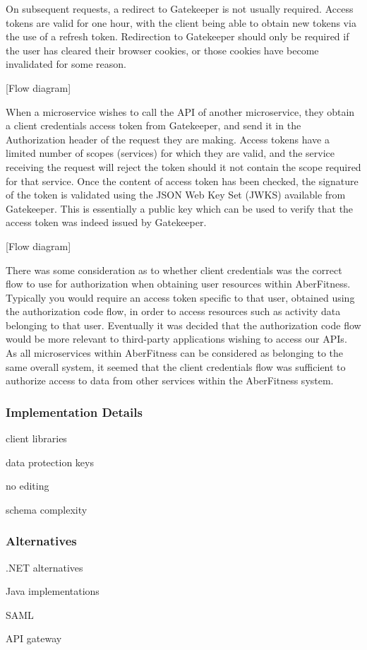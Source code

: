 On subsequent requests, a redirect to Gatekeeper is not usually required.  Access tokens are valid for one hour, with the client being able to obtain new tokens via the use of a refresh token.  Redirection to Gatekeeper should only be required if the user has cleared their browser cookies, or those cookies have become invalidated for some reason.

[Flow diagram]

When a microservice wishes to call the API of another microservice, they obtain a client credentials access token from Gatekeeper, and send it in the Authorization header of the request they are making.  Access tokens have a limited number of scopes (services) for which they are valid, and the service receiving the request will reject the token should it not contain the scope required for that service.  Once the content of access token has been checked, the signature of the token is validated using the JSON Web Key Set (JWKS) available from Gatekeeper.  This is essentially a public key which can be used to verify that the access token was indeed issued by Gatekeeper.

[Flow diagram]


There was some consideration as to whether client credentials was the correct flow to use for authorization when obtaining user resources within AberFitness.  Typically you would require an access token specific to that user, obtained using the authorization code flow, in order to access resources such as activity data belonging to that user.  Eventually it was decided that the authorization code flow would be more relevant to third-party applications wishing to access our APIs.  As all microservices within AberFitness can be considered as belonging to the same overall system, it seemed that the client credentials flow was sufficient to authorize access to data from other services within the AberFitness system.

\subsubsection{Implementation Details}

client libraries

data protection keys

no editing

schema complexity

\subsubsection{Alternatives}

.NET alternatives

Java implementations

SAML

API gateway
